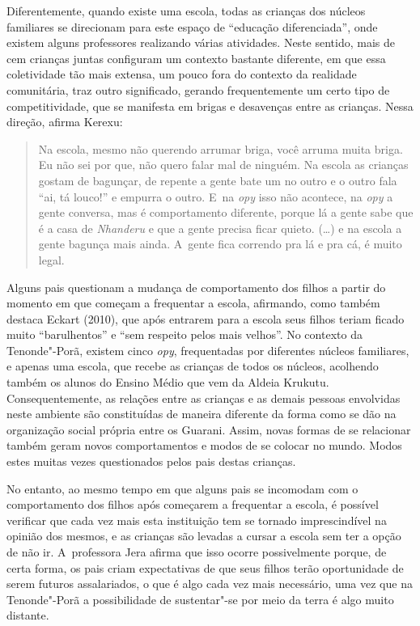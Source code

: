 Diferentemente, quando existe uma escola, todas as crianças dos núcleos
familiares se direcionam para este espaço de ``educação diferenciada'',
onde existem alguns professores realizando várias atividades. Neste
sentido, mais de cem crianças juntas configuram um contexto bastante
diferente, em que essa coletividade tão mais extensa, um pouco fora do
contexto da realidade comunitária, traz outro significado, gerando
frequentemente um certo tipo de competitividade, que se manifesta em
brigas e desavenças entre as crianças. Nessa direção, afirma Kerexu:

\begin{quote}
\noindent
Na escola, mesmo não querendo arrumar briga, você arruma muita briga. Eu
não sei por que, não quero falar mal de ninguém. Na escola as crianças
gostam de bagunçar, de repente a gente bate um no outro e o outro fala
``ai, tá louco!'' e empurra o outro. E~na \emph{opy} isso não acontece, na \emph{opy} a
gente conversa, mas é comportamento diferente, porque lá a gente sabe
que é a casa de \emph{Nhanderu} e que a gente precisa ficar quieto. (\ldots{}) e na
escola a gente bagunça mais ainda. A~gente fica correndo pra lá e pra
cá, é muito legal.
\end{quote}

Alguns pais questionam a mudança de comportamento dos filhos a partir do
momento em que começam a frequentar a escola, afirmando, como também
destaca Eckart (2010), que após entrarem para a escola seus filhos
teriam ficado muito ``barulhentos'' e ``sem respeito pelos mais velhos''.
No contexto da Tenonde"-Porã, existem cinco \emph{opy}, frequentadas por
diferentes núcleos familiares, e apenas uma escola, que recebe as
crianças de todos os núcleos, acolhendo também os alunos do Ensino
Médio que vem da Aldeia Krukutu. Consequentemente, as relações entre as
crianças e as demais pessoas envolvidas neste ambiente são constituídas
de maneira diferente da forma como se dão na organização social própria
entre os Guarani. Assim, novas formas de se relacionar também geram
novos comportamentos e modos de se colocar no mundo. Modos estes muitas
vezes questionados pelos pais destas crianças. 

No entanto, ao mesmo tempo em que alguns pais se incomodam com o
comportamento dos filhos após começarem a frequentar a escola, é
possível verificar que cada vez mais esta instituição tem se tornado
imprescindível na opinião dos mesmos, e as crianças são levadas a
cursar a escola sem ter a opção de não ir. A~professora Jera afirma que
isso ocorre possivelmente porque, de certa forma, os pais criam
expectativas de que seus filhos terão oportunidade de serem futuros
assalariados, o que é algo cada vez mais necessário, uma vez que na
Tenonde"-Porã a possibilidade de sustentar"-se por meio da terra é algo
muito distante.


